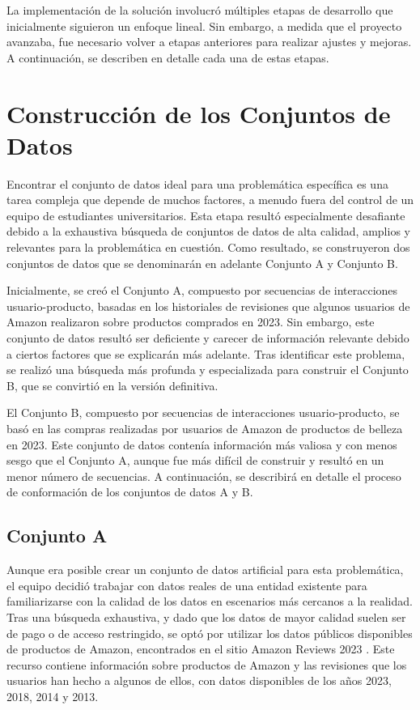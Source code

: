 \documentclass[runningheads]{llncs}
\begin{document}
La implementación de la solución involucró múltiples etapas de desarrollo que inicialmente siguieron un enfoque lineal. Sin embargo, a medida que el proyecto avanzaba, fue necesario volver a etapas anteriores para realizar ajustes y mejoras. A continuación, se describen en detalle cada una de estas etapas.

\section{Construcción de los Conjuntos de Datos}

Encontrar el conjunto de datos ideal para una problemática específica es una tarea compleja que depende de muchos factores, a menudo fuera del control de un equipo de estudiantes universitarios. Esta etapa resultó especialmente desafiante debido a la exhaustiva búsqueda de conjuntos de datos de alta calidad, amplios y relevantes para la problemática en cuestión. Como resultado, se construyeron dos conjuntos de datos que se denominarán en adelante Conjunto A y Conjunto B.

Inicialmente, se creó el Conjunto A, compuesto por secuencias de interacciones usuario-producto, basadas en los historiales de revisiones que algunos usuarios de Amazon realizaron sobre productos comprados en 2023. Sin embargo, este conjunto de datos resultó ser deficiente y carecer de información relevante debido a ciertos factores que se explicarán más adelante. Tras identificar este problema, se realizó una búsqueda más profunda y especializada para construir el Conjunto B, que se convirtió en la versión definitiva.

El Conjunto B, compuesto por secuencias de interacciones usuario-producto, se basó en las compras realizadas por usuarios de Amazon de productos de belleza en 2023. Este conjunto de datos contenía información más valiosa y con menos sesgo que el Conjunto A, aunque fue más difícil de construir y resultó en un menor número de secuencias. A continuación, se describirá en detalle el proceso de conformación de los conjuntos de datos A y B.

\subsection{Conjunto A}

Aunque era posible crear un conjunto de datos artificial para esta problemática, el equipo decidió trabajar con datos reales de una entidad existente para familiarizarse con la calidad de los datos en escenarios más cercanos a la realidad. Tras una búsqueda exhaustiva, y dado que los datos de mayor calidad suelen ser de pago o de acceso restringido, se optó por utilizar los datos públicos disponibles de productos de Amazon, encontrados en el sitio Amazon Reviews 2023 \cite{amazonreviews}. Este recurso contiene información sobre productos de Amazon y las revisiones que los usuarios han hecho a algunos de ellos, con datos disponibles de los años 2023, 2018, 2014 y 2013.
\end{document}

